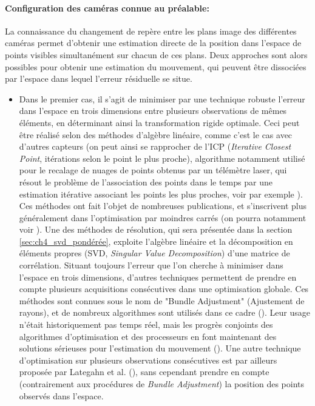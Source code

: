 \paragraph{Configuration des caméras connue au préalable:\\}
La connaissance du changement de repère entre les plans image des différentes caméras permet d'obtenir une estimation directe de la position dans l'espace de points visibles simultanément sur chacun de ces plans. Deux approches sont alors possibles pour obtenir une estimation du mouvement, qui peuvent être dissociées par l'espace dans lequel l'erreur résiduelle se situe.\\
\begin{itemize}
	\item{} Dans le premier cas, il s'agit de minimiser par une technique robuste l'erreur dans l'espace en trois dimensions entre plusieurs observations de mêmes éléments, en déterminant ainsi la transformation rigide optimale. Ceci peut être réalisé selon des méthodes d'algèbre linéaire, comme c'est le cas avec d'autres capteurs (on peut ainsi se rapprocher de l'ICP (\emph{Iterative Closest Point}, itérations selon le point le plus proche), algorithme notamment utilisé pour le recalage de nuages de points obtenus par un télémètre laser, qui résout le problème de l'association des points dans le temps par une estimation itérative associant les points les plus proches, voir par exemple \cite{Rusinkiewicz}). Ces méthodes ont fait l'objet de nombreuses publications, et s'inscrivent plus généralement dans l'optimisation par moindres carrés (on pourra notamment voir \cite{Arun1987,Umeyama1991, Goryn1995, Eggert1997}). Une des méthodes de résolution, qui sera présentée dans la section \ref{sec:ch4_svd_pondérée}, exploite l'algèbre linéaire et la décomposition en éléments propres (SVD, \emph{Singular Value Decomposition}) d'une matrice de corrélation. Situant toujours l'erreur que l'on cherche à minimiser dans l'espace en trois dimensions, d'autres techniques permettent de prendre en compte plusieurs acquisitions consécutives dans une optimisation globale. Ces méthodes sont connues sous le nom de "Bundle Adjustment" (Ajustement de rayons), et de nombreux algorithmes sont utilisés dans ce cadre (\cite{Triggs2000}). Leur usage n'était historiquement pas temps réel, mais les progrès conjoints des algorithmes d'optimisation et des processeurs en font maintenant des solutions sérieuses pour l'estimation du mouvement (\cite{Niko2006, Konolige2008}). Une autre technique d'optimisation sur plusieurs observations consécutives est par ailleurs proposée par Lategahn et al. (\cite{Lategahna}), sans cependant prendre en compte (contrairement aux procédures de \emph{Bundle Adjustment}) la position des points observés dans l'espace. \\
	

\end{itemize}
